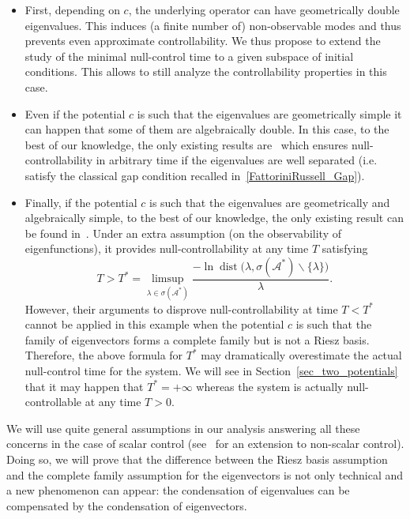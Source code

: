 \documentclass[11pt]{article}
\theoremstyle{definition}
\numberwithin{equation}{section}
\numberwithin{figure}{section}
\numberwithin{table}{section}
\newcommand\As{\mathcal{A}^*}
\DeclareMathOperator{\dist}{dist}
\begin{document}
\begin{itemize}
\item First, depending on $c$, the underlying operator can have geometrically double eigenvalues. This induces (a finite number of) non-observable modes and thus prevents even approximate controllability. We thus propose to extend the study of the minimal null-control time to a given subspace of initial conditions. This allows to still analyze the controllability properties in this case.
\item Even if the potential $c$ is such that the eigenvalues are geometrically simple it can happen that some of them are algebraically double. In this case, to the best of our knowledge, the only existing results are~\cite{AKBGBDT_Kalman,FCGBdT:2010} which ensures null-controllability in arbitrary time if the eigenvalues are well separated (i.e. satisfy the classical gap condition recalled in~\eqref{FattoriniRussell_Gap}).
\item Finally, if the potential $c$ is such that the eigenvalues are geometrically and algebraically simple, to the best of our knowledge, the only existing result can be found in~\cite{AmmarKhodjaBenabdallahGonzalez-BurgosdeTeresa:2014}. Under an extra assumption (on the observability of eigenfunctions), it provides null-controllability at any time $T$ satisfying
\[
T > T^* = \limsup_{ \lambda \in \sigma(\As)} \frac{ -\ln \dist\big(\lambda, \sigma(\As) \backslash \{ \lambda \} \big)}{\lambda}.
\]
However, their arguments to disprove null-controllability at time $T < T^*$ cannot be applied in this example when the potential $c$ is such that the family of eigenvectors forms a complete family but is not a Riesz basis. Therefore, the above formula for $T^*$ may dramatically overestimate the actual null-control time for the system. We will see in Section~\ref{sec_two_potentials} that it may happen that $T^*=+\infty$ whereas the system is actually null-controllable at any time $T>0$.
\end{itemize}

We will use quite general assumptions in our analysis answering all these concerns in the case of scalar control (see~\cite{BoyerMorancey} for an extension to non-scalar control). Doing so, we will prove that the difference between the Riesz basis assumption and the complete family assumption for the eigenvectors is not only technical and a new phenomenon can appear: the condensation of eigenvalues can be compensated by the condensation of eigenvectors.
\end{document}
